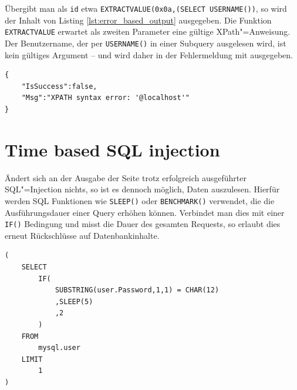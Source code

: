 Übergibt man als \texttt{id} etwa \texttt{EXTRACTVALUE(0x0a,(SELECT USERNAME())}, so wird der Inhalt von Listing \ref{lst:error_based_output} ausgegeben. Die Funktion \texttt{EXTRACTVALUE} erwartet als zweiten Parameter eine gültige XPath"=Anweisung. Der Benutzername, der per \texttt{USERNAME()} in einer Subquery ausgelesen wird, ist kein gültiges Argument -- und wird daher in der Fehlermeldung mit ausgegeben.

\begin{listing}
\begin{margincap}
\begin{verbatim}
{
    "IsSuccess":false,
    "Msg":"XPATH syntax error: '@localhost'"
}
\end{verbatim}
\caption{Ausgabe der \emph{Error based} SQL"=Injection. In der Fehlermeldung ist das Resultat der Subquery zu sehen, in diesem Fall der Rückgabewert der Funktion \texttt{USERNAME().}}
\label{lst:error_based_output}
\end{margincap}
\end{listing}


\section{Time based SQL injection}

Ändert sich an der Ausgabe der Seite trotz erfolgreich ausgeführter SQL"=Injection nichts, so ist es dennoch möglich, Daten auszulesen. Hierfür werden SQL Funktionen wie \texttt{SLEEP()} oder \texttt{BENCHMARK()} verwendet, die die Ausführungsdauer einer Query erhöhen können. Verbindet man dies mit einer \texttt{IF()} Bedingung und misst die Dauer des gesamten Requests, so erlaubt dies erneut Rückschlüsse auf Datenbankinhalte.

\begin{listing}[ht!]
\begin{margincap}
\begin{verbatim}
(
    SELECT
        IF(
            SUBSTRING(user.Password,1,1) = CHAR(12)
            ,SLEEP(5)
            ,2
        )
    FROM
        mysql.user
    LIMIT
        1
)
\end{verbatim}
\caption[timebased]{Diese Query vergleicht ein einzelnes Zeichen einer Zeichenkette mit einem bestimmten ASCII"=Code. Liefert der Vergleich \texttt{true}, so wird fünf Sekunden gewartet.}
\label{lst:time_based}
\end{margincap}
\end{listing}


















